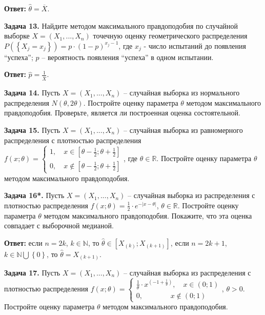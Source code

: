 \textbf{Ответ:} $\widehat{\theta }=\overline{X}$.



\textbf{Задача 13.} Найдите методом максимального правдоподобия по случайной выборке $X=\left(X_{1} ,...,X_{n} \right)$ точечную оценку геометрического распределения $P\left(\left\{X_{j} =x_{j} \right\}\right)=p\cdot \left(1-p\right)^{x_{j} -1} $, где $x_{j} $ - число испытаний до появления ``успеха''; $p$ -- вероятность появления ``успеха'' в одном испытании.

\textbf{Ответ:} $\widehat{p}=\frac{1}{\overline{X}} $.

\textbf{Задача 14.} Пусть $X=\left(X_{1} ,...,X_{n} \right)$ -- случайная выборка из нормального распределения $N\left(\theta ,2\theta \right)$. Постройте оценку параметра $\theta $ методом максимального правдоподобия. Проверьте, является ли построенная оценка состоятельной.



\textbf{Задача 15.} Пусть $X=\left(X_{1} ,...,X_{n} \right)$ -- случайная выборка из равномерного распределения с плотностью распределения $f\left(x;\theta \right)=\left\{\begin{array}{l} {1,\quad x\in \left[\theta -{\tfrac{1}{2}} ;\theta +{\tfrac{1}{2}} \right]} \\ {0,\quad x\notin \left[\theta -{\tfrac{1}{2}} ;\theta +{\tfrac{1}{2}} \right]} \end{array}\right. $, где $\theta \in {\mathbb R}$. Постройте оценку параметра $\theta $ методом максимального правдоподобия.



\textbf{Задача 16*.} Пусть $X=\left(X_{1} ,...,X_{n} \right)$ -- случайная выборка из распределения с плотностью распределения $f\left(x;\theta \right)={\tfrac{1}{2}} \cdot e^{-\left|x-\theta \right|} $, $\theta \in {\mathbb R}$. Постройте оценку параметра $\theta $ методом максимального правдоподобия. Покажите, что эта оценка совпадает с выборочной медианой.

\textbf{Ответ: }если $n=2k$, $k\in {\mathbb N}$, то $\widehat{\theta }\in \left[X_{\left(k\right)} ;X_{\left(k+1\right)} \right]$,\textbf{ }если $n=2k+1$, $k\in {\mathbb N}\bigcup \left\{0\right\}$, то $\widehat{\theta }=X_{\left(k+1\right)} $. 



\textbf{Задача 17.} Пусть $X=\left(X_{1} ,...,X_{n} \right)$ -- случайная выборка из распределения с плотностью распределения $f\left(x;\theta \right)=\left\{\begin{array}{l} {{\tfrac{1}{\theta }} \cdot x^{\left(-1+{\tfrac{1}{\theta }} \right)} ,\quad x\in \left(0;1\right)} \\ {0,\quad \quad \quad \; \; \; x\notin \left(0;1\right)} \end{array}\right. $, $\theta >0$. Постройте оценку параметра $\theta $ методом максимального правдоподобия.

